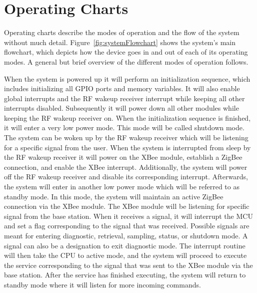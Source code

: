 \section{Operating Charts}
Operating charts describe the modes of operation and the flow of the system without much detail. Figure~\ref{fig:systemFlowchart} shows the system's main flowchart, which depicts how the device goes in and out of each of its operating modes.  A general but brief overview of the different modes of operation follows.

When the system is powered up it will perform an initialization sequence, which includes initializing all GPIO ports and memory variables. It will also enable global interrupts and the RF wakeup receiver interrupt while keeping all other interrupts disabled. Subsequently it will power down all other modules while keeping the RF wakeup receiver on.
When the initialization sequence is finished, it will enter a very low power mode. This mode will be called shutdown mode. The system can be woken up by the RF wakeup receiver which will be listening for a specific signal from the user. When the system is interrupted from sleep by the RF wakeup receiver it will power on the XBee module, establish a ZigBee connection, and enable the XBee interrupt. Additionally, the system will power off the RF wakeup receiver and disable its corresponding interrupt.
Afterwards, the system will enter in another low power mode which will be referred to as standby mode. In this mode, the system will maintain an active ZigBee connection via the XBee module. The XBee module will be listening for specific signal from the base station. When it receives a signal, it will interrupt the MCU and set a flag corresponding to the signal that was received. Possible signals are meant for entering diagnostic, retrieval, sampling, status, or shutdown mode. A signal can also be a designation to exit diagnostic mode. The interrupt routine will then take the CPU to active mode, and the system will proceed to execute the service corresponding to the signal that was sent to the XBee module via the base station. After the service has finished executing, the system will return to standby mode where it will listen for more incoming commands.

